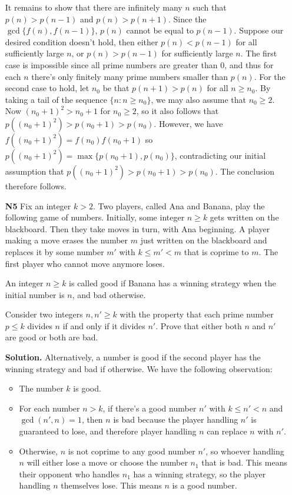 \documentclass[11pt,a4paper]{article}
\begin{document}
\begin{enumerate}
	It remains to show that there are infinitely many $n$ such that $p(n)>p(n-1)$ and $p(n)>p(n+1)$. 
	Since the $\gcd\{f(n), f(n-1)\}$, $p(n)$ cannot be equal to $p(n-1)$. 
	Suppose our desired condition doesn't hold, then either $p(n)<p(n-1)$ for all sufficiently large $n$, or $p(n)>p(n-1)$ for sufficiently large $n$. The first case is impossible since all prime numbers are greater than 0, and thus for each $n$ there's only finitely many prime numbers smaller than $p(n)$. 
	For the second case to hold, let $n_0$ be that $p(n+1)>p(n)$ for all $n\ge n_0$. 
	By taking a tail of the sequence $\{n: n\ge n_0\}$, we may also assume that $n_0\ge 2$. 
	Now $(n_0+1)^2>n_0+1$ for $n_0\ge 2$, so it also follows that $p((n_0+1)^2)>p(n_0+1)>p(n_0)$. 
	However, we have $f((n_0+1)^2)=f(n_0)f(n_0+1)$ so $p((n_0+1)^2)=\max\{p(n_0+1), p(n_0)\}$, contradicting our initial assumption that $p((n_0+1)^2)>p(n_0+1)>p(n_0)$. The conclusion therefore follows. 
	
	\item[\textbf{N5}] Fix an integer $k>2$. Two players, called Ana and Banana, play the following game of numbers. Initially, some integer $n \ge k$ gets written on the blackboard. Then they take moves in turn, with Ana beginning. A player making a move erases the number $m$ just written on the blackboard and replaces it by some number $m'$ with $k \le m' < m$ that is coprime to $m$. The first player who cannot move anymore loses.
	
	An integer $n \ge k $ is called good if Banana has a winning strategy when the initial number is $n$, and bad otherwise.
	
	Consider two integers $n,n' \ge k$ with the property that each prime number $p \le k$ divides $n$ if and only if it divides $n'$. Prove that either both $n$ and $n'$ are good or both are bad.
	
	\textbf{Solution.} Alternatively, a number is good if the second player has the winning strategy and bad if otherwise. We have the following observation: 
	
	\begin{itemize} 
		\item The number $k$ is good. 
		
		\item For each number $n>k$, if there's a good number $n'$ with $k\le n'<n$ and $\gcd(n', n)=1$, then $n$ is bad because the player handling $n'$ is guaranteed to lose, and therefore player handling $n$ can replace $n$ with $n'$. 
		
		\item Otherwise, $n$ is not coprime to any good number $n'$, so whoever handling $n$ will either lose a move or choose the number $n_1$ that is bad. This means their opponent who handles $n_1$ has a winning strategy, so the player handling $n$ themselves lose. This means $n$ is a good number. 
		

\end{itemize}
\end{enumerate}
\end{document}
